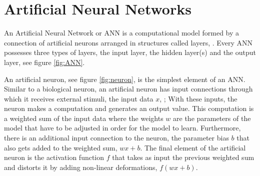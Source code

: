 \appendix










\section{Artificial Neural Networks}

An Artificial Neural Network or ANN is a computational model formed by a connection of artificial neurons arranged in structures called layers, \cite{ANN-graupe:2013}. Every ANN possesses three types of layers, the input layer, the hidden layer(s) and the output layer, see figure \ref{fig:ANN}.


An artificial neuron, see figure \ref{fig:neuron}, is the simplest element of an ANN. Similar to a biological neuron, an artificial neuron has input connections through which it receives external stimuli, the input data $x$, \cite{ANN-graupe:2013}; With these inputs, the neuron makes a computation and generates an output value. This computation is a weighted sum of the input data where the weights $w$ are the parameters of the model that have to be adjusted in order for the model to learn. Furthermore, there is an additional input connection to the neuron, the parameter bias $b$ that also gets added to the weighted sum, $wx + b$. The final element of the artificial neuron is the activation function $f$ that takes as input the previous weighted sum and distorts it by adding non-linear deformations, $f(wx + b)$.

